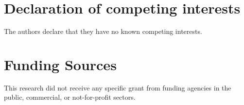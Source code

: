 \documentclass[preprint,review,12pt]{elsarticle}
\begin{document}
\section*{Declaration of competing interests}
The authors declare that they have no known competing interests.

\section*{Funding  Sources}
This research did not receive any specific grant from funding agencies in the public, commercial, or not-for-profit sectors.

%  
 

 

\end{document}
